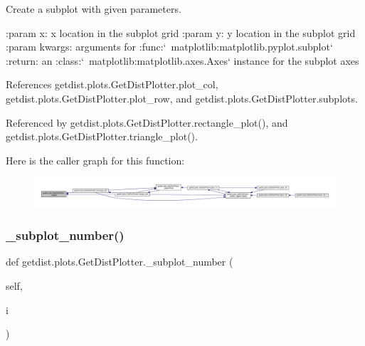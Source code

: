 \begin{DoxyVerb}Create a subplot with given parameters.

:param x: x location in the subplot grid
:param y: y location in the subplot grid
:param kwargs: arguments for :func:`~matplotlib:matplotlib.pyplot.subplot`
:return: an :class:`~matplotlib:matplotlib.axes.Axes` instance for the subplot axes
\end{DoxyVerb}
 

References getdist.\+plots.\+Get\+Dist\+Plotter.\+plot\+\_\+col, getdist.\+plots.\+Get\+Dist\+Plotter.\+plot\+\_\+row, and getdist.\+plots.\+Get\+Dist\+Plotter.\+subplots.



Referenced by getdist.\+plots.\+Get\+Dist\+Plotter.\+rectangle\+\_\+plot(), and getdist.\+plots.\+Get\+Dist\+Plotter.\+triangle\+\_\+plot().

Here is the caller graph for this function\+:
\nopagebreak
\begin{figure}[H]
\begin{center}
\leavevmode
\includegraphics[width=350pt]{classgetdist_1_1plots_1_1GetDistPlotter_aa9058a1f333a84c5d0c7b8f5c5a83da3_icgraph}
\end{center}
\end{figure}
\mbox{\label{classgetdist_1_1plots_1_1GetDistPlotter_ab193e6cfc6a0ea34b119fe7d1f3aee54}} 
\subsubsection{\texorpdfstring{\+\_\+subplot\+\_\+number()}{\_subplot\_number()}}
{\footnotesize\ttfamily def getdist.\+plots.\+Get\+Dist\+Plotter.\+\_\+subplot\+\_\+number (\begin{DoxyParamCaption}\item[{}]{self,  }\item[{}]{i }\end{DoxyParamCaption})\hspace{0.3cm}{\ttfamily [private]}}

